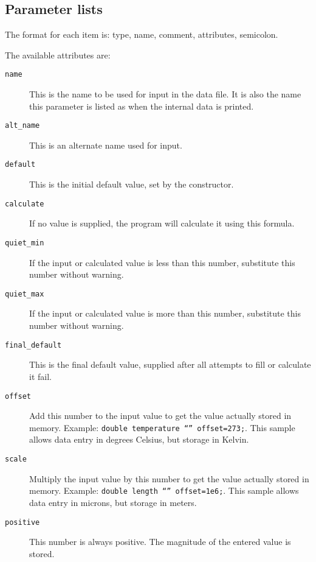 \subsection{Parameter lists}

The format for each item is: type, name, comment, attributes, semicolon.

The available attributes are:

\begin{description}

\item[{\tt name}]
This is the name to be used for input in the data file.  It is also
the name this parameter is listed as when the internal data is
printed.

\item[{\tt alt\_name}]
This is an alternate name used for input.

\item[{\tt default}]
This is the initial default value, set by the constructor.

\item[{\tt calculate}]
If no value is supplied, the program will calculate it using this
formula.

\item[{\tt quiet\_min}]
If the input or calculated value is less than this number, substitute
this number without warning.

\item[{\tt quiet\_max}]
If the input or calculated value is more than this number, substitute
this number without warning.

\item[{\tt final\_default}]
This is the final default value, supplied after all attempts to fill
or calculate it fail.

\item[{\tt offset}]
Add this number to the input value to get the value actually stored in
memory.  Example: {\tt double temperature ``'' offset=273;}.  This
sample allows data entry in degrees Celsius, but storage in Kelvin.

\item[{\tt scale}]
Multiply the input value by this number to get the value actually
stored in memory.  Example: {\tt double length ``'' offset=1e6;}.
This sample allows data entry in microns, but storage in meters.

\item[{\tt positive}]
This number is always positive.  The magnitude of the entered value is
stored.


\end{description}
